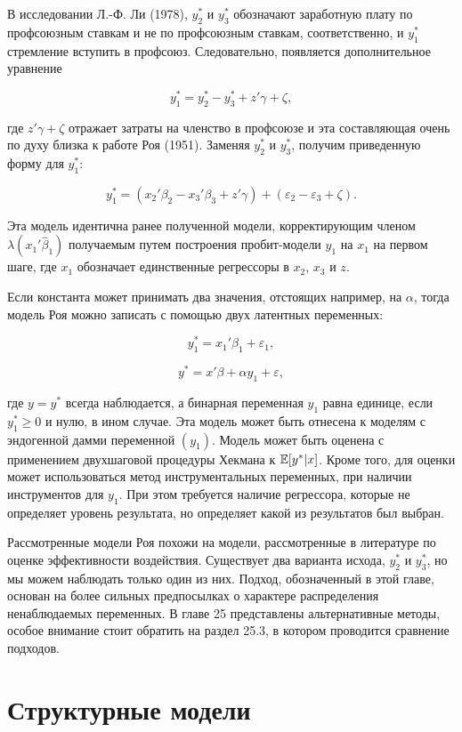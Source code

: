В исследовании Л.-Ф. Ли (1978), $y_2^{*}$ и $y_3^{*}$ обозначают заработную плату по профсоюзным ставкам и не по профсоюзным ставкам, соответственно, и $y_1^{*}$ стремление вступить в профсоюз. Следовательно, появляется дополнительное уравнение

\[
y_1^{*}=y_2^{*}-y_3^{*}+z'\gamma+\zeta,
\]

где $z'\gamma+\zeta$ отражает затраты на членство в профсоюзе и эта составляющая очень по духу близка к работе  Роя (1951). Заменяя $y_2^{*}$ и $y_3^{*}$, получим приведенную форму для $y_1^{*}$:

\[
y_1^{*}=(x_2'\beta_2-x_3'\beta_3+z'\gamma)+(\varepsilon_2-\varepsilon_3+\zeta).
\]

Эта модель идентична  ранее полученной модели,  корректирующим членом $\lambda(x_1'\hat{\beta}_1)$ получаемым путем построения пробит-модели $y_1$ на $x_1$  на первом шаге, где $x_1$ обозначает единственные регрессоры в $x_2$, $x_3$ и $z$.

Если константа может принимать два значения, отстоящих например, на $\alpha$, тогда  модель Роя можно записать с помощью двух латентных переменных: 

\[
y_1^{*}=x_1'\beta_1+\varepsilon_1,
\]

\[
y^* =x'\beta+{\alpha}y_1+\varepsilon,
\]

где $y=y^* $ всегда наблюдается, а бинарная переменная $y_1$ равна единице, если $y_1^{*}{\geq}0$ и нулю, в ином случае. Эта модель может быть отнесена к моделям с эндогенной дамми переменной $(y_1)$. Модель может быть оценена с применением двухшаговой процедуры Хекмана к $\mathbb{E}[y^*|x]$. Кроме того, для оценки может использоваться метод инструментальных переменных, при наличии инструментов для $y_1$. При этом требуется наличие регрессора, которые не определяет уровень результата, но определяет какой из результатов был выбран.

Рассмотренные модели Роя похожи на модели, рассмотренные в литературе по оценке эффективности воздействия. Существует два варианта исхода, $y_2^{*}$ и $y_3^{*}$, но мы можем наблюдать только один из них. Подход, обозначенный в этой главе, основан на более сильных предпосылках о характере распределения ненаблюдаемых переменных. В главе 25 представлены альтернативные методы, особое внимание стоит обратить на раздел 25.3, в котором проводится сравнение подходов.

\section{Структурные модели}

